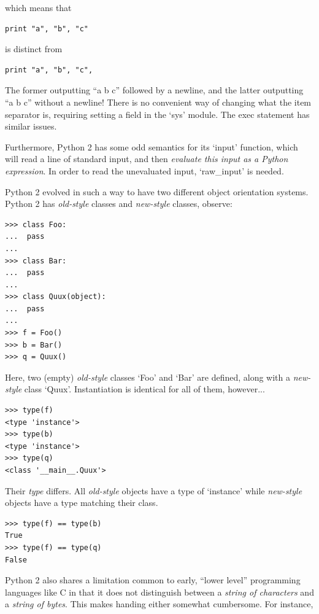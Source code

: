 \documentclass[10pt,a4paper,notitlepage,twoside]{report}
\begin{document}
which means that
\begin{lstlisting}[language={[2]Python}]
print "a", "b", "c"
\end{lstlisting}

is distinct from
\begin{lstlisting}[language={[2]Python}]
print "a", "b", "c",
\end{lstlisting}

The former outputting ``a b c'' followed by a newline, and the latter outputting ``a b c'' without a newline! There is no convenient way of changing what the item separator is, requiring setting a field in the `sys' module. The exec statement has similar issues.

Furthermore, Python 2 has some odd semantics for its `input' function, which will read a line of standard input, and then \emph{evaluate this input as a Python expression}. In order to read the unevaluated input, `raw_input' is needed.

Python 2 evolved in such a way to have two different object orientation systems. Python 2 has \emph{old-style} classes and \emph{new-style} classes, observe:

\begin{lstlisting}[language={[2]Python}]
>>> class Foo:
...  pass
... 
>>> class Bar:
...  pass
... 
>>> class Quux(object):
...  pass
... 
>>> f = Foo()
>>> b = Bar()
>>> q = Quux()
\end{lstlisting}

Here, two (empty) \emph{old-style} classes `Foo' and `Bar' are defined, along with a \emph{new-style} class `Quux'. Instantiation is identical for all of them, however...

\begin{lstlisting}[language={[2]Python}]
>>> type(f)
<type 'instance'>
>>> type(b)
<type 'instance'>
>>> type(q)
<class '__main__.Quux'>
\end{lstlisting}

Their \emph{type} differs. All \emph{old-style} objects have a type of `instance' while \emph{new-style} objects have a type matching their class.

\begin{lstlisting}[language={[2]Python}]
>>> type(f) == type(b)
True
>>> type(f) == type(q)
False
\end{lstlisting}

Python 2 also shares a limitation common to early, ``lower level'' programming languages like C in that it does not distinguish between a \emph{string of characters} and a \emph{string of bytes}.
This makes handing either somewhat cumbersome. For instance,
\end{document}
